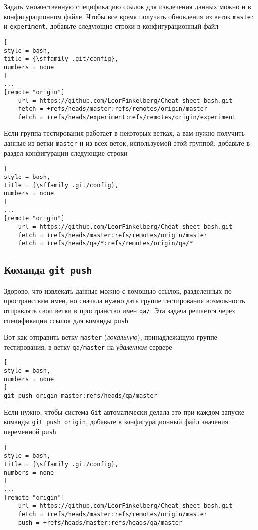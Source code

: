 \documentclass[%
	11pt,
	a4paper,
	utf8,
		]{article}
\begin{document}
Задать множественную спецификацию ссылок для извлечения данных можно и в конфигурационном файле. Чтобы все время получать обновления из веток \texttt{master} и \texttt{experiment}, добавьте следующие строки в конфигурационный файл
\begin{lstlisting}[
style = bash,
title = {\sffamily .git/config},
numbers = none
]
...
[remote "origin"]
    url = https://github.com/LeorFinkelberg/Cheat_sheet_bash.git
    fetch = +refs/heads/master:refs/remotes/origin/master
    fetch = +refs/heads/experiment:refs/remotes/origin/experiment
\end{lstlisting}

Если группа тестирования работает в некоторых ветках, а вам нужно получить данные из ветки \texttt{master} и из всех веток, используемой этой группой, добавьте в раздел конфигурации следующие строки
\begin{lstlisting}[
style = bash,
title = {\sffamily .git/config},
numbers = none
]
...
[remote "origin"]
    url = https://github.com/LeorFinkelberg/Cheat_sheet_bash.git
    fetch = +refs/heads/master:refs/remotes/origin/master
    fetch = +refs/heads/qa/*:refs/remotes/origin/qa/*
\end{lstlisting}


\subsection{Команда \texttt{git push}}

Здорово, что извлекать данные можно с помощью ссылок, разделенных по пространствам имен, но сначала нужно дать группе тестирования возможность отправлять свои ветки в пространство имен \verb|qa/|. Эта задача решается через спецификации ссылок для команды \texttt{push}.

Вот как отправить ветку \texttt{master} (\emph{локальную}), принадлежащую группе тестирования, в ветку \verb|qa/master| на \emph{удаленном} сервере
\begin{lstlisting}[
style = bash,
numbers = none
]
git push origin master:refs/heads/qa/master
\end{lstlisting}

Если нужно, чтобы система \texttt{Git} автоматически делала это при каждом запуске команды \texttt{git push origin}, добавьте в конфигурационный файл значения переменной \texttt{push}
\begin{lstlisting}[
style = bash,
title = {\sffamily .git/config},
numbers = none
]
...
[remote "origin"]
    url = https://github.com/LeorFinkelberg/Cheat_sheet_bash.git
    fetch = +refs/heads/master:refs/remotes/origin/master
    push = +refs/heads/master:refs/heads/qa/master
\end{lstlisting}
\end{document}
